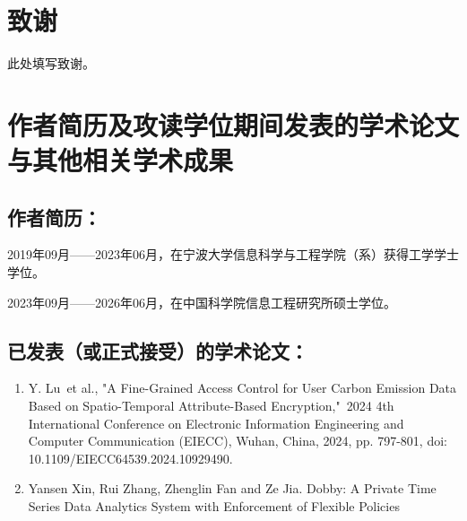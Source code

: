 \chapter[致谢]{致\quad 谢}%

此处填写致谢。


\chapter{作者简历及攻读学位期间发表的学术论文与其他相关学术成果}

\section*{作者简历：}
2019年09月——2023年06月，在宁波大学信息科学与工程学院（系）获得工学学士学位。


2023年09月——2026年06月，在中国科学院信息工程研究所硕士学位。


\section*{已发表（或正式接受）的学术论文：}

{
\setlist[enumerate]{}%
\begin{enumerate}[nosep]
    \item Y. Lu et al., "A Fine-Grained Access Control for User Carbon Emission Data Based on Spatio-Temporal Attribute-Based Encryption," 2024 4th International Conference on Electronic Information Engineering and Computer Communication (EIECC), Wuhan, China, 2024, pp. 797-801, doi: 10.1109/EIECC64539.2024.10929490.

    \item Yansen Xin, Rui Zhang, Zhenglin Fan and Ze Jia. Dobby: A Private Time Series Data Analytics System with Enforcement of Flexible Policies
\end{enumerate}
}

